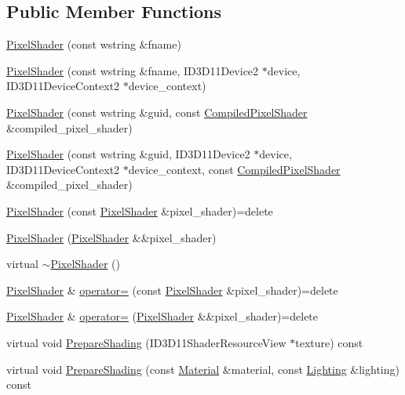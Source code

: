 \subsection*{Public Member Functions}
\begin{DoxyCompactItemize}
\item 
\hyperlink{classmage_1_1_pixel_shader_aceac0769412c88171ca85503165a85c0}{Pixel\+Shader} (const wstring \&fname)
\item 
\hyperlink{classmage_1_1_pixel_shader_a965f56338d989774814b841074eda637}{Pixel\+Shader} (const wstring \&fname, I\+D3\+D11\+Device2 $\ast$device, I\+D3\+D11\+Device\+Context2 $\ast$device\+\_\+context)
\item 
\hyperlink{classmage_1_1_pixel_shader_af4473cf5c1a5b8e5fe4b8b780cddec08}{Pixel\+Shader} (const wstring \&guid, const \hyperlink{structmage_1_1_compiled_pixel_shader}{Compiled\+Pixel\+Shader} \&compiled\+\_\+pixel\+\_\+shader)
\item 
\hyperlink{classmage_1_1_pixel_shader_a429db17d6be8d71d11cc306d2fafdc4b}{Pixel\+Shader} (const wstring \&guid, I\+D3\+D11\+Device2 $\ast$device, I\+D3\+D11\+Device\+Context2 $\ast$device\+\_\+context, const \hyperlink{structmage_1_1_compiled_pixel_shader}{Compiled\+Pixel\+Shader} \&compiled\+\_\+pixel\+\_\+shader)
\item 
\hyperlink{classmage_1_1_pixel_shader_a361df943e40e9015ac4b769af130ce79}{Pixel\+Shader} (const \hyperlink{classmage_1_1_pixel_shader}{Pixel\+Shader} \&pixel\+\_\+shader)=delete
\item 
\hyperlink{classmage_1_1_pixel_shader_a5b2d7d36082d25c6f860674df745f7cd}{Pixel\+Shader} (\hyperlink{classmage_1_1_pixel_shader}{Pixel\+Shader} \&\&pixel\+\_\+shader)
\item 
virtual \hyperlink{classmage_1_1_pixel_shader_aac21a59d5d614f5bf1905f01479de44e}{$\sim$\+Pixel\+Shader} ()
\item 
\hyperlink{classmage_1_1_pixel_shader}{Pixel\+Shader} \& \hyperlink{classmage_1_1_pixel_shader_ac3a3535b2751237f4aad110dca05d0c3}{operator=} (const \hyperlink{classmage_1_1_pixel_shader}{Pixel\+Shader} \&pixel\+\_\+shader)=delete
\item 
\hyperlink{classmage_1_1_pixel_shader}{Pixel\+Shader} \& \hyperlink{classmage_1_1_pixel_shader_aaeab6f6fda7d6e1f7d333da03d58daf9}{operator=} (\hyperlink{classmage_1_1_pixel_shader}{Pixel\+Shader} \&\&pixel\+\_\+shader)=delete
\item 
virtual void \hyperlink{classmage_1_1_pixel_shader_ab677013145ca252c57e5a001134c01ff}{Prepare\+Shading} (I\+D3\+D11\+Shader\+Resource\+View $\ast$texture) const
\item 
virtual void \hyperlink{classmage_1_1_pixel_shader_a5a1a58bcb0ed64405e746ec7a5af5269}{Prepare\+Shading} (const \hyperlink{structmage_1_1_material}{Material} \&material, const \hyperlink{structmage_1_1_lighting}{Lighting} \&lighting) const
\end{DoxyCompactItemize}
